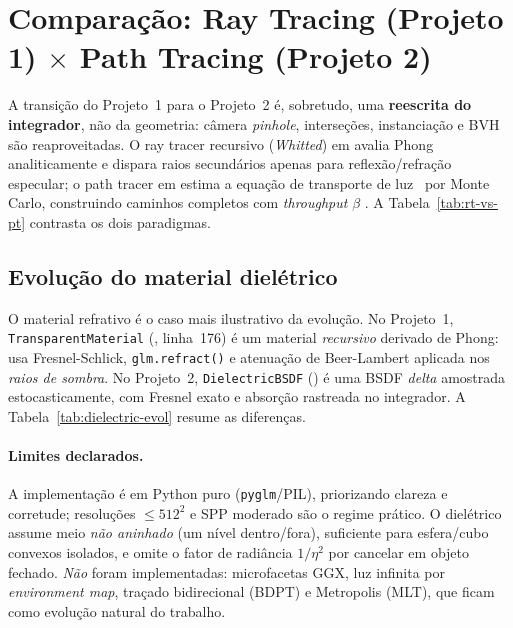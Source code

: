 \documentclass[portuguese]{sbcreviews-2025}%
\newcommand{\pbrtcontentsurl}{https://pbr-book.org/4ed/contents.html}
\newcommand{\pbrtsecs}[1]{\citep[\href{\pbrtcontentsurl}{Se\c{c}\~oes~#1}]{pharr2023pbrt}}
\begin{document}
\clearpage

\section{Comparação: Ray Tracing (Projeto 1) \texorpdfstring{$\times$}{x} Path Tracing (Projeto 2)}
\label{sec:comparacao}

A transição do Projeto~1 para o Projeto~2 é, sobretudo, uma \textbf{reescrita do integrador},
não da geometria: câmera \emph{pinhole}, interseções, instanciação e BVH são reaproveitadas. O
ray tracer recursivo (\emph{Whitted}) em  avalia Phong analiticamente
e dispara raios secundários apenas para reflexão/refração especular; o path tracer em
 estima a equação de transporte de luz~\citep{kajiya1986rendering}
por Monte Carlo, construindo caminhos completos com \emph{throughput} $\beta$
\pbrtsecs{13.1, 13.3, 13.4}. A Tabela~\ref{tab:rt-vs-pt} contrasta os dois paradigmas.

\subsection{Evolução do material dielétrico}
\label{sec:dielectric-evol}

O material refrativo é o caso mais ilustrativo da evolução. No Projeto~1,
\texttt{TransparentMaterial} (, linha~176) é um material
\emph{recursivo} derivado de Phong: usa Fresnel-Schlick, \texttt{glm.refract()} e atenuação de
Beer-Lambert aplicada nos \emph{raios de sombra}. No Projeto~2, \texttt{DielectricBSDF}
() é uma BSDF \emph{delta} amostrada
estocasticamente, com Fresnel exato e absorção rastreada no integrador. A
Tabela~\ref{tab:dielectric-evol} resume as diferenças.

\paragraph{Limites declarados.} A implementação é em Python puro (\texttt{pyglm}/PIL),
priorizando clareza e corretude; resoluções $\le 512^2$ e SPP moderado são o regime prático.
O dielétrico assume meio \emph{não aninhado} (um nível dentro/fora), suficiente para
esfera/cubo convexos isolados, e omite o fator de radiância $1/\eta^2$ por cancelar em objeto
fechado. \emph{Não} foram implementadas: microfacetas GGX, luz infinita por \emph{environment
map}, traçado bidirecional (BDPT) e Metropolis (MLT), que ficam como evolução natural do
trabalho.
\end{document}
